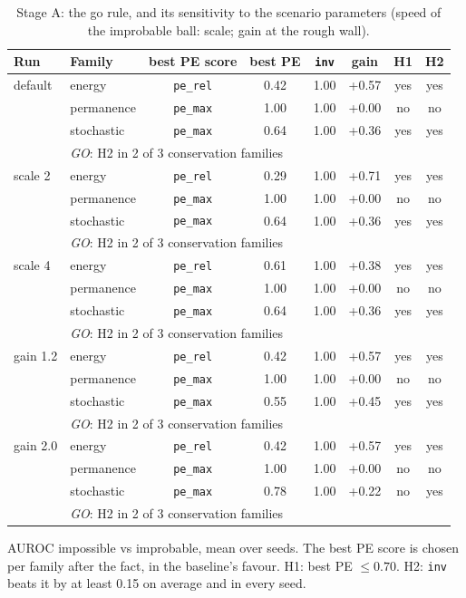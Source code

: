 \begin{table}[t]\centering\small
\caption{Stage A: the go rule, and its sensitivity to the scenario parameters (speed of the improbable ball: scale; gain at the rough wall).}\label{tab:sensitivity}
\begin{tabular}{llcccccc}\toprule
Run & Family & best PE score & best PE & \texttt{inv} & gain & H1 & H2\\\midrule
default & energy & \texttt{pe\_rel} & 0.42 & 1.00 & +0.57 & yes & yes\\
 & permanence & \texttt{pe\_max} & 1.00 & 1.00 & +0.00 & no & no\\
 & stochastic & \texttt{pe\_max} & 0.64 & 1.00 & +0.36 & yes & yes\\
& \multicolumn{7}{l}{\emph{GO}: H2 in 2 of 3 conservation families}\\\midrule
scale 2 & energy & \texttt{pe\_rel} & 0.29 & 1.00 & +0.71 & yes & yes\\
 & permanence & \texttt{pe\_max} & 1.00 & 1.00 & +0.00 & no & no\\
 & stochastic & \texttt{pe\_max} & 0.64 & 1.00 & +0.36 & yes & yes\\
& \multicolumn{7}{l}{\emph{GO}: H2 in 2 of 3 conservation families}\\\midrule
scale 4 & energy & \texttt{pe\_rel} & 0.61 & 1.00 & +0.38 & yes & yes\\
 & permanence & \texttt{pe\_max} & 1.00 & 1.00 & +0.00 & no & no\\
 & stochastic & \texttt{pe\_max} & 0.64 & 1.00 & +0.36 & yes & yes\\
& \multicolumn{7}{l}{\emph{GO}: H2 in 2 of 3 conservation families}\\\midrule
gain 1.2 & energy & \texttt{pe\_rel} & 0.42 & 1.00 & +0.57 & yes & yes\\
 & permanence & \texttt{pe\_max} & 1.00 & 1.00 & +0.00 & no & no\\
 & stochastic & \texttt{pe\_max} & 0.55 & 1.00 & +0.45 & yes & yes\\
& \multicolumn{7}{l}{\emph{GO}: H2 in 2 of 3 conservation families}\\\midrule
gain 2.0 & energy & \texttt{pe\_rel} & 0.42 & 1.00 & +0.57 & yes & yes\\
 & permanence & \texttt{pe\_max} & 1.00 & 1.00 & +0.00 & no & no\\
 & stochastic & \texttt{pe\_max} & 0.78 & 1.00 & +0.22 & no & yes\\
& \multicolumn{7}{l}{\emph{GO}: H2 in 2 of 3 conservation families}\\\bottomrule
\end{tabular}
\par\smallskip\footnotesize AUROC impossible vs improbable, mean over seeds. The best PE score is chosen per family after the fact, in the baseline's favour. H1: best PE $\le 0.70$. H2: \texttt{inv} beats it by at least 0.15 on average and in every seed.
\end{table}

